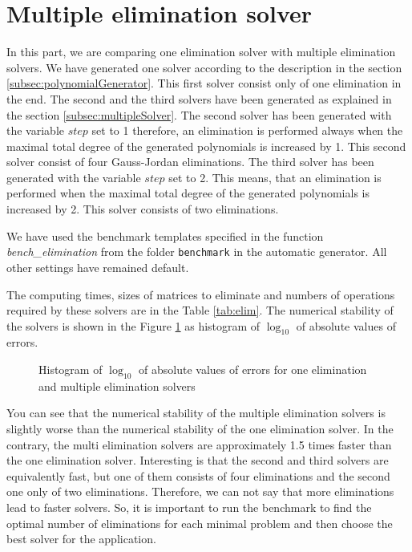 \section{Multiple elimination solver}
\label{exp:elim}
In this part, we are comparing one elimination solver with multiple elimination solvers. We have generated one solver according to the description in the section \ref{subsec:polynomialGenerator}. This first solver consist only of one elimination in the end. The second and the third solvers have been generated as explained in the section \ref{subsec:multipleSolver}. The second solver has been generated with the variable $step$ set to 1 therefore, an elimination is performed always when the maximal total degree of the generated polynomials is increased by 1. This second solver consist of four Gauss-Jordan eliminations. The third solver has been generated with the variable $step$ set to 2. This means, that an elimination is performed when the maximal total degree of the generated polynomials is increased by 2. This solver consists of two eliminations.

We have used the benchmark templates specified in the function \textit{bench\_elimination} from the folder \texttt{benchmark} in the automatic generator. All other settings have remained default.

The computing times, sizes of matrices to eliminate and numbers of operations required by these solvers are in the Table \ref{tab:elim}. The numerical stability of the solvers is shown in the Figure \ref{graph:elim} as histogram of $\log_{10}$ of absolute values of errors.

\begin{figure}[ht]
  \centering
  \resizebox{0.95\textwidth}{!}{}
  \caption{Histogram of $\log_{10}$ of absolute values of errors for one elimination and multiple elimination solvers}
  \label{graph:elim}
\end{figure}

You can see that the numerical stability of the multiple elimination solvers is slightly worse than the numerical stability of the one elimination solver. In the contrary, the multi elimination solvers are approximately 1.5 times faster than the one elimination solver. Interesting is that the second and third solvers are equivalently fast, but one of them consists of four eliminations and the second one only of two eliminations. Therefore, we can not say that more eliminations lead to faster solvers. So, it is important to run the benchmark to find the optimal number of eliminations for each minimal problem and then choose the best solver for the application.

